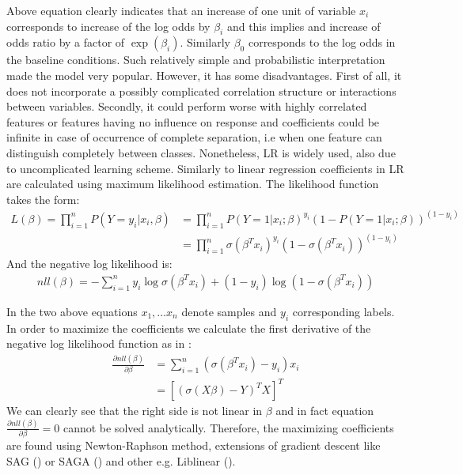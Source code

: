 \documentclass[12pt, wide]{mwart}
\begin{document}
Above equation clearly indicates that an increase of one unit of variable $x_i$ corresponds to increase of the log odds by $\beta_i$ and this implies and increase of odds ratio by a factor of $\exp(\beta_i)$. Similarly $\beta_0$ corresponds to the log odds in the baseline conditions. Such relatively simple and probabilistic interpretation made the model very popular. However, it has some disadvantages. First of all, it does not incorporate a possibly complicated correlation structure or interactions between variables. Secondly, it could perform worse with highly correlated features or features having no influence on response and coefficients could be infinite in case of occurrence of complete separation, i.e when one feature can distinguish completely between classes. Nonetheless, LR is widely used, also due to uncomplicated learning scheme. Similarly to linear regression coefficients in LR are calculated using maximum likelihood estimation. The likelihood function takes the form:
\begin{align*}
    L(\beta) = \prod_{i=1}^n P(Y=y_i | x_i, \beta) &= \prod_{i=1}^n P(Y=1 | x_i ; \beta)^{y_i}(1-P(Y=1 | x_i ; \beta))^{\left(1-y_i\right)} \\
&= \prod_{i=1}^n \sigma\left(\beta^{T} x_i\right)^{y_i}\left(1-\sigma\left(\beta^{T} x_i\right)\right)^{\left(1-y_i\right)}
\end{align*}
And the negative log likelihood is:
\begin{align*}
    nll(\beta)=-\sum_{i=1}^{n} y_i \log \sigma\left(\beta^{T} x_i\right)+\left(1-y_i\right) \log \left(1-\sigma\left(\beta^{T} x_i\right)\right)
\end{align*}

In the two above equations $x_1, \ldots x_n$ denote samples and $y_i$ corresponding labels. In order to maximize the coefficients we calculate the first derivative of the negative log likelihood function as in \cite[chapter 4.4.1]{ESL2}:
\begin{align*}
    \frac{\partial nll(\beta)}{\partial \beta}&=\sum_{i=1}^{n}\left(\sigma\left(\beta^{T} x_i\right)-y_i\right) x_i\\ &=
    \left[\left(\sigma(X\beta) - Y\right)^TX\right]^T
\end{align*}
We can clearly see that the right side is not linear in $\beta$ and in fact equation $\frac{\partial nll(\beta)}{\partial \beta} = 0$ cannot be solved analytically. Therefore, the maximizing coefficients are found using Newton-Raphson method, extensions of gradient descent like SAG (\cite{sag}) or SAGA (\cite{saga}) and other e.g. Liblinear (\cite{liblinear}). 
\end{document}
